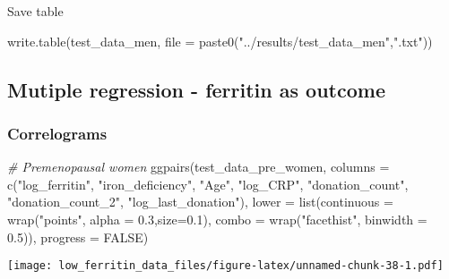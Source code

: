 \documentclass[
]{article}
\newenvironment{Shaded}{\begin{snugshade}}{\end{snugshade}}
\newcommand{\AttributeTok}[1]{\textcolor[rgb]{0.77,0.63,0.00}{#1}}
\newcommand{\CommentTok}[1]{\textcolor[rgb]{0.56,0.35,0.01}{\textit{#1}}}
\newcommand{\ConstantTok}[1]{\textcolor[rgb]{0.00,0.00,0.00}{#1}}
\newcommand{\FloatTok}[1]{\textcolor[rgb]{0.00,0.00,0.81}{#1}}
\newcommand{\FunctionTok}[1]{\textcolor[rgb]{0.00,0.00,0.00}{#1}}
\newcommand{\NormalTok}[1]{#1}
\newcommand{\StringTok}[1]{\textcolor[rgb]{0.31,0.60,0.02}{#1}}
\begin{document}
Save table

\begin{Shaded}
\begin{Highlighting}[]
\FunctionTok{write.table}\NormalTok{(test\_data\_men, }\AttributeTok{file =} \FunctionTok{paste0}\NormalTok{(}\StringTok{"../results/test\_data\_men"}\NormalTok{,}\StringTok{".txt"}\NormalTok{))}
\end{Highlighting}
\end{Shaded}

\hypertarget{mutiple-regression---ferritin-as-outcome}{%
\subsection{Mutiple regression - ferritin as
outcome}\label{mutiple-regression---ferritin-as-outcome}}

\hypertarget{correlograms}{%
\subsubsection{Correlograms}\label{correlograms}}

\begin{Shaded}
\begin{Highlighting}[]
\CommentTok{\# Premenopausal women}
\FunctionTok{ggpairs}\NormalTok{(test\_data\_pre\_women, }
        \AttributeTok{columns =} \FunctionTok{c}\NormalTok{(}\StringTok{"log\_ferritin"}\NormalTok{, }\StringTok{"iron\_deficiency"}\NormalTok{, }\StringTok{"Age"}\NormalTok{, }\StringTok{"log\_CRP"}\NormalTok{,  }\StringTok{"donation\_count"}\NormalTok{, }\StringTok{"donation\_count\_2"}\NormalTok{,}
                    \StringTok{"log\_last\_donation"}\NormalTok{),}
         \AttributeTok{lower =} \FunctionTok{list}\NormalTok{(}\AttributeTok{continuous =} \FunctionTok{wrap}\NormalTok{(}\StringTok{"points"}\NormalTok{, }\AttributeTok{alpha =} \FloatTok{0.3}\NormalTok{,}\AttributeTok{size=}\FloatTok{0.1}\NormalTok{),}
                      \AttributeTok{combo =} \FunctionTok{wrap}\NormalTok{(}\StringTok{"facethist"}\NormalTok{, }\AttributeTok{binwidth =} \FloatTok{0.5}\NormalTok{)),}
        \AttributeTok{progress =} \ConstantTok{FALSE}\NormalTok{)}
\end{Highlighting}
\end{Shaded}

\texttt{[image: low\_ferritin\_data\_files/figure-latex/unnamed-chunk-38-1.pdf]}
\end{document}
